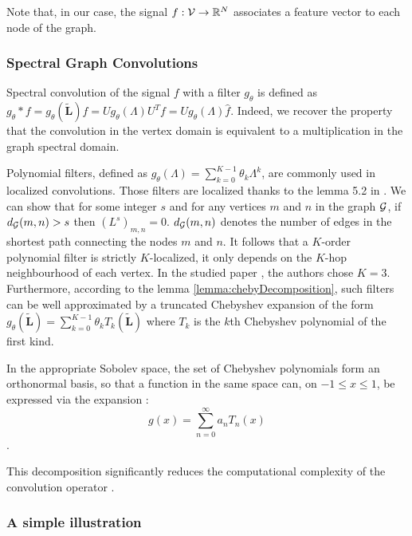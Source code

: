 Note that, in our case, the signal $f:\mathcal{V}\rightarrow\mathbb{R}^N$ associates a feature vector to each node of the graph.

\subsubsection{Spectral Graph Convolutions}

Spectral convolution of the signal $f$ with a filter $g_\theta$ is defined as $g_\theta * f = g_\theta(\widetilde{\mathbf{L}})f = Ug_\theta(\Lambda)U^Tf = U g_\theta(\Lambda)\hat{f}$. 
Indeed, we recover the property that the convolution in the vertex domain is equivalent to a multiplication in the graph spectral domain.

Polynomial filters, defined as $g_\theta(\Lambda) = \sum_{k=0}^{K-1}\theta_k\Lambda^k$, are commonly used in localized convolutions. Those filters are localized thanks to the lemma 5.2 in \cite{hammond_wavelets_2011}. We can show that for some integer $s$ and for any 
vertices $m$ and $n$ in the graph $\mathcal{G}$, if $d_{\mathcal{G}}(m, n) > s$ then $(L^s)_{m, n} = 0$. $d_{\mathcal{G}}(m, n)$ denotes the number of edges in the shortest path connecting the nodes $m$ and $n$.
It follows that a $K$-order polynomial filter is strictly $K$-localized, \ie it only depends on the $K$-hop neighbourhood of each vertex. In the studied paper \cite{Parisot17}, the authors chose $K=3$.\\ 
Furthermore, according to the lemma \ref{lemma:chebyDecomposition}, such filters can be well approximated by a truncated Chebyshev expansion of the form $g_\theta(\widetilde{\mathbf{L}}) = \sum_{k=0}^{K-1}\theta_kT_k(\widetilde{\mathbf{L}})$ where $T_k$ is the $k$th Chebyshev polynomial of the first kind.
\begin{lemma}\label{lemma:chebyDecomposition}
    In the appropriate Sobolev space, the set of Chebyshev polynomials form an orthonormal basis, so that a function in the same space can, on $-1\leq x \leq 1$, be expressed via the expansion : $$g(x) = \sum_{n=0}^{\infty} a_nT_n(x)$$.
\end{lemma}
This decomposition significantly reduces the computational complexity of the convolution operator \cite{Parisot17}.


\subsubsection{A simple illustration}

